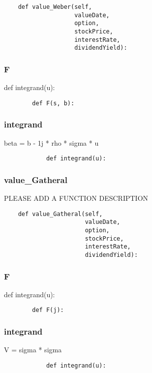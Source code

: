 \documentclass[twoside,11pt]{book}
\begin{document}
\begin{lstlisting}
    def value_Weber(self,
                    valueDate,
                    option,
                    stockPrice,
                    interestRate,
                    dividendYield):
\end{lstlisting}

\subsubsection*{{\bf F}}
def integrand(u): 

\begin{lstlisting}
        def F(s, b):
\end{lstlisting}

\subsubsection*{{\bf integrand}}
beta = b - 1j * rho * sigma * u 

\begin{lstlisting}
            def integrand(u):
\end{lstlisting}

\subsubsection*{{\bf value\_Gatheral}}
PLEASE ADD A FUNCTION DESCRIPTION

\begin{lstlisting}
    def value_Gatheral(self,
                       valueDate,
                       option,
                       stockPrice,
                       interestRate,
                       dividendYield):
\end{lstlisting}

\subsubsection*{{\bf F}}
def integrand(u): 

\begin{lstlisting}
        def F(j):
\end{lstlisting}

\subsubsection*{{\bf integrand}}
V = sigma * sigma 

\begin{lstlisting}
            def integrand(u):
\end{lstlisting}
\end{document}

